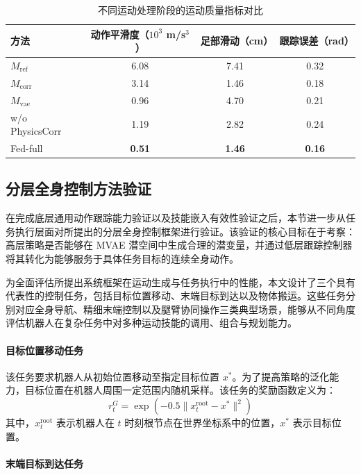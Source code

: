 \begin{table}[htbp]
	\centering
	\caption{不同运动处理阶段的运动质量指标对比}
	\label{tab:motion_quality}
	\begin{tabular}{lccc}
		\toprule
		方法 & 动作平滑度（$10^3$ m/s$^3$） & 足部滑动（cm） & 跟踪误差（rad） \\
		\midrule
		$M_{\text{ref}}$ & 6.08 & 7.41 & 0.32 \\
		$M_{\text{corr}}$ & 3.14 & 1.46 & 0.18 \\
		$M_{\text{vae}}$ & 0.96 & 4.70 & 0.21 \\
		\midrule
		w/o PhysicsCorr & 1.19 & 2.82 & 0.24 \\
		Fed-full & \textbf{0.51} & \textbf{1.46} & \textbf{0.16} \\
		\bottomrule
	\end{tabular}
\end{table}

\subsection{分层全身控制方法验证}

在完成底层通用动作跟踪能力验证以及技能嵌入有效性验证之后，本节进一步从任务执行层面对所提出的分层全身控制框架进行验证。该验证的核心目标在于考察：高层策略是否能够在 MVAE 潜空间中生成合理的潜变量，并通过低层跟踪控制器将其转化为能够服务于具体任务目标的连续全身动作。

为全面评估所提出系统框架在运动生成与任务执行中的性能，本文设计了三个具有代表性的控制任务，包括目标位置移动、末端目标到达以及物体搬运。这些任务分别对应全身导航、精细末端控制以及腿臂协同操作三类典型场景，能够从不同角度评估机器人在复杂任务中对多种运动技能的调用、组合与规划能力。

\paragraph{目标位置移动任务}

该任务要求机器人从初始位置移动至指定目标位置 $x^*$。为了提高策略的泛化能力，目标位置在机器人周围一定范围内随机采样。该任务的奖励函数定义为：
\begin{equation}
	r_t^G=\exp\left(-0.5\|x_t^{\text{root}}-x^*\|^2\right)
\end{equation}
其中，$x_t^{\text{root}}$ 表示机器人在 $t$ 时刻根节点在世界坐标系中的位置，$x^*$ 表示目标位置。

\paragraph{末端目标到达任务}

